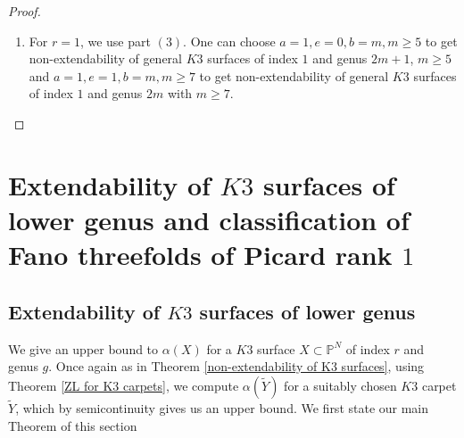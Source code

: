 \documentclass[11pt,twoside]{amsart}
\theoremstyle{plain}
\numberwithin{equation}{section}
\theoremstyle{definition}
\begin{document}
\begin{proof}
\begin{enumerate}
       \smallskip

       \item[(5)]  For $r = 1$, we use part $(3)$. One can choose $a = 1, e = 0, b = m, m \geq 5$ to get non-extendability of general $K3$ surfaces of index $1$ and genus $2m+1$, $m \geq 5$ and $a = 1, e = 1, b = m, m \geq 7$ to get non-extendability of general $K3$ surfaces of index $1$ and genus $2m$ with $m \geq 7$.
        
        
    \end{enumerate}
\end{proof}


\section{Extendability of $K3$ surfaces of lower genus and classification of Fano threefolds of Picard rank $1$}

\subsection{Extendability of $K3$ surfaces of lower genus}
We give an upper bound to $\alpha(X)$ for a $K3$ surface $X \subset \mathbb{P}^N$ of index $r$ and genus $g$. Once again as in Theorem \ref{non-extendability of K3 surfaces}, using Theorem \ref{ZL for K3 carpets}, we compute $\alpha(\widetilde{Y})$ for a suitably chosen $K3$ carpet $\widetilde{Y}$, which by semicontinuity gives us an upper bound. We first state our main Theorem of this section
\end{document}
